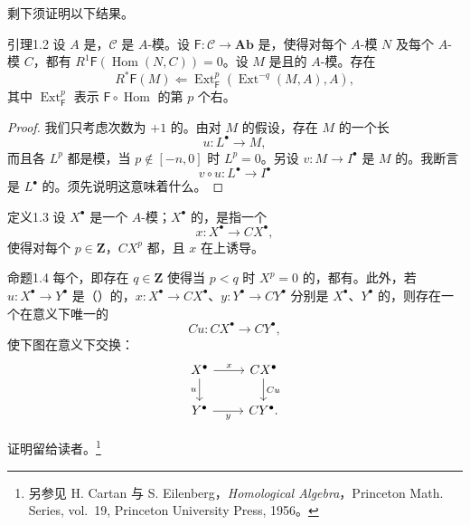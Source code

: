 剩下须证明以下结果。
\begin{SGAresult}{引理}{1.2}
设 $A$ 是，$\mathcal C$ 是 $A$-模。设 $\mathsf F:\mathcal C\to\mathbf{Ab}$ 是，使得对每个 $A$-模 $N$ 及每个 $A$-模 $C$，都有 $R^1\mathsf F(\operatorname{Hom}(N,C))=0$。设 $M$ 是且的 $A$-模。存在
\[R^*\mathsf F(M)\Longleftarrow\operatorname{Ext}^p_{\mathsf F}(\operatorname{Ext}^{-q}(M,A),A),\]
其中 $\operatorname{Ext}^p_{\mathsf F}$ 表示 $\mathsf F\circ\operatorname{Hom}$ 的第 $p$ 个右。
\end{SGAresult}
\begin{proof}
我们只考虑次数为 $+1$ 的。由对 $M$ 的假设，存在 $M$ 的一个长
\[u:L^{\bullet}\longrightarrow M,\]
而且各 $L^p$ 都是模，当 $p\notin[-n,0]$ 时 $L^p=0$。另设 $v:M\to I^{\bullet}$ 是 $M$ 的。我断言
\[v\circ u:L^{\bullet}\longrightarrow I^{\bullet}\tag{1.1}\]
是 $L^{\bullet}$ 的。须先说明这意味着什么。
\end{proof}
\begin{SGAresult}{定义}{1.3}
设 $X^{\bullet}$ 是一个 $A$-模；$X^{\bullet}$ 的，是指一个
\[x:X^{\bullet}\longrightarrow CX^{\bullet},\]
使得对每个 $p\in\mathbf Z$，$CX^p$ 都，且 $x$ 在上诱导。
\end{SGAresult}
\begin{SGAresult}{命题}{1.4}
每个，即存在 $q\in\mathbf Z$ 使得当 $p<q$ 时 $X^p=0$ 的，都有。此外，若 $u:X^{\bullet}\to Y^{\bullet}$ 是（）的，$x:X^{\bullet}\to CX^{\bullet}$、$y:Y^{\bullet}\to CY^{\bullet}$ 分别是 $X^{\bullet}$、$Y^{\bullet}$ 的，则存在一个在意义下唯一的
\[Cu:CX^{\bullet}\longrightarrow CY^{\bullet},\]
使下图在意义下交换：
\[
\begin{tikzcd}
X^{\bullet}\arrow[r,"x"]\arrow[d,"u"']&CX^{\bullet}\arrow[d,"Cu"]\\
Y^{\bullet}\arrow[r,"y"']&CY^{\bullet}.
\end{tikzcd}
\]
\end{SGAresult}
证明留给读者。\footnote{另参见 H. Cartan 与 S. Eilenberg，\emph{Homological Algebra}，Princeton Math. Series, vol.~19, Princeton University Press, 1956。}

